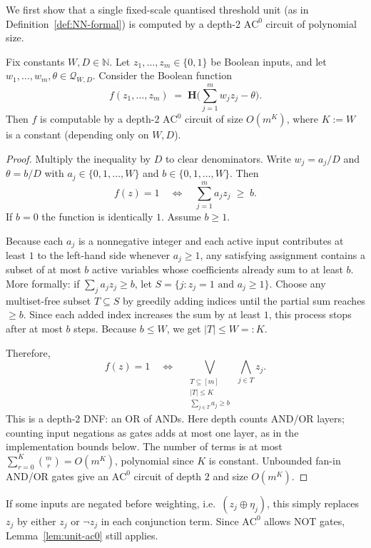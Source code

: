 \documentclass[twoside,11pt]{article}
\newcommand{\AC}{\mathrm{AC}}
\newcommand{\Heav}{\mathbf{H}}
\newcommand{\bits}{\{0,1\}}
\newcommand{\N}{\mathbb{N}}
\newcommand{\Qset}{\mathcal{Q}}
\numberwithin{theorem}{section}
\numberwithin{equation}{section}
\begin{document}
We first show that a single fixed-scale quantised threshold unit (as in Definition~\ref{def:NN-formal}) is computed by a depth-2 $\AC^0$ circuit of polynomial size.

\begin{lemma}[Fixed-scale quantised threshold gate $\in\AC^0$]
\label{lem:unit-ac0}
Fix constants $W,D\in\N$.
Let $z_1,\dots,z_m\in\bits$ be Boolean inputs, and let $w_1,\dots,w_m,\theta\in\Qset_{W,D}$.
Consider the Boolean function
\[
f(z_1,\dots,z_m) \;=\; \Heav\!\Big(\sum_{j=1}^m w_j z_j - \theta\Big).
\]
Then $f$ is computable by a depth-2 $\AC^0$ circuit of size $O(m^K)$, where $K:=W$ is a constant (depending only on $W,D$).
\end{lemma}

\begin{proof}
Multiply the inequality by $D$ to clear denominators.
Write $w_j=a_j/D$ and $\theta=b/D$ with $a_j\in\{0,1,\dots,W\}$ and $b\in\{0,1,\dots,W\}$.
Then
\[
f(z)=1 \quad\Longleftrightarrow\quad \sum_{j=1}^m a_j z_j \;\ge\; b.
\]
If $b=0$ the function is identically $1$. Assume $b\ge 1$.

Because each $a_j$ is a nonnegative integer and each active input contributes at least $1$ to the left-hand side whenever $a_j\ge 1$, any satisfying assignment contains a subset of at most $b$ active variables whose coefficients already sum to at least $b$.
More formally: if $\sum_j a_j z_j \ge b$, let $S=\{j:z_j=1 \text{ and } a_j\ge 1\}$. Choose any multiset-free subset $T\subseteq S$ by greedily adding indices until the partial sum reaches $\ge b$. Since each added index increases the sum by at least $1$, this process stops after at most $b$ steps. Because $b\le W$, we get $|T|\le W=:K$.

Therefore,
\[
f(z)=1 \quad\Longleftrightarrow\quad
\bigvee_{\substack{T\subseteq[m]\\ |T|\le K\\ \sum_{j\in T} a_j\ge b}}
\ \bigwedge_{j\in T} z_j.
\]
This is a depth-2 DNF: an OR of ANDs. Here depth counts AND/OR layers; counting input negations as gates adds at most one layer, as in the implementation bounds below.
The number of terms is at most $\sum_{r=0}^K \binom{m}{r}=O(m^K)$, polynomial since $K$ is constant.
Unbounded fan-in AND/OR gates give an $\AC^0$ circuit of depth $2$ and size $O(m^K)$.
\end{proof}

\begin{remark}[Negations]
If some inputs are negated before weighting, i.e.\ $(z_j\oplus \eta_j)$, this simply replaces $z_j$ by either $z_j$ or $\neg z_j$ in each conjunction term.
Since $\AC^0$ allows NOT gates, Lemma~\ref{lem:unit-ac0} still applies.
\end{remark}
\end{document}
